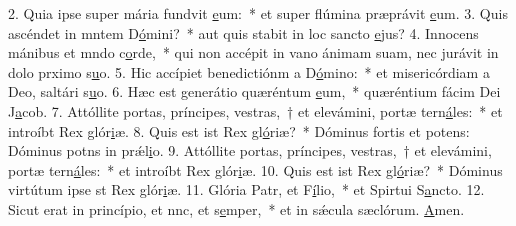 2. Quia ipse super mária fundvit \uline{e}um:~* et super flúmina præprávit \uline{e}um.
3. Quis ascéndet in mntem D\uline{ó}mini?~* aut quis stabit in loc sancto \uline{e}jus?
4. Innocens mánibus et mndo c\uline{o}rde,~* qui non accépit in vano ánimam suam, nec jurávit in dolo prximo s\uline{u}o.
5. Hic accípiet benedictiónm a D\uline{ó}mino:~* et misericórdiam a Deo, saltári s\uline{u}o.
6. Hæc est generátio quæréntum \uline{e}um,~* quæréntium fácim Dei J\uline{a}cob.
7. Attóllite portas, príncipes, vestras,~† et elevámini, portæ tern\uline{á}les:~* et introíbt Rex glór\uline{i}æ.
8. Quis est ist Rex gl\uline{ó}riæ?~* Dóminus fortis et potens: Dóminus potns in prǽl\uline{i}o.
9. Attóllite portas, príncipes, vestras,~† et elevámini, portæ tern\uline{á}les:~* et introíbt Rex glór\uline{i}æ.
10. Quis est ist Rex gl\uline{ó}riæ?~* Dóminus virtútum ipse st Rex glór\uline{i}æ.
11. Glória Patr, et F\uline{í}lio,~* et Spirtui S\uline{a}ncto.
12. Sicut erat in princípio, et nnc, et s\uline{e}mper,~* et in sǽcula sæclórum. \uline{A}men.
